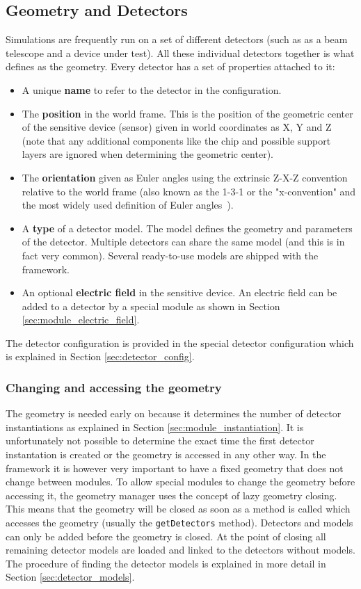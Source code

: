 \subsection{Geometry and Detectors}
\label{sec:models_geometry}
Simulations are frequently run on a set of different detectors (such as as a beam telescope and a device under test). All these individual detectors together is what \apsq defines as the geometry. Every detector has a set of properties attached to it:
\begin{itemize}
\item A unique \textbf{name} to refer to the detector in the configuration.
\item The \textbf{position} in the world frame. This is the position of the geometric center of the sensitive device (sensor) given in world coordinates as X, Y and Z (note that any additional components like the chip and possible support layers are ignored when determining the geometric center).
\item The \textbf{orientation} given as Euler angles using the extrinsic Z-X-Z convention relative to the world frame (also known as the 1-3-1 or the "x-convention" and the most widely used definition of Euler angles~\cite{eulerangles}). 
\item A \textbf{type} of a detector model. The model defines the geometry and parameters of the detector. Multiple detectors can share the same model (and this is in fact very common). Several ready-to-use models are shipped with the framework.
\item An optional \textbf{electric field} in the sensitive device. An electric field can be added to a detector by a special module as shown in Section \ref{sec:module_electric_field}.
\end{itemize}
The detector configuration is provided in the special detector configuration which is explained in Section \ref{sec:detector_config}.

\subsubsection{Changing and accessing the geometry}
The geometry is needed early on because it determines the number of detector instantiations as explained in Section \ref{sec:module_instantiation}. It is unfortunately not possible to determine the exact time the first detector instantation is created or the geometry is accessed in any other way. In the framework it is however very important to have a fixed geometry that does not change between modules. To allow special modules to change the geometry before accessing it, the geometry manager uses the concept of lazy geometry closing. This means that the geometry will be closed as soon as a method is called which accesses the geometry (usually the \texttt{getDetectors} method). Detectors and models can only be added before the geometry is closed. At the point of closing all remaining detector models are loaded and linked to the detectors without models. The procedure of finding the detector models is explained in more detail in Section \ref{sec:detector_models}.

